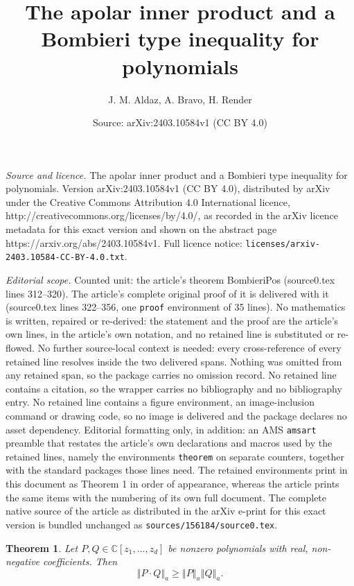 \documentclass[10pt,a4paper]{amsart}
\title{The apolar inner product and a Bombieri type inequality for polynomials}
\author{J. M. Aldaz, A. Bravo, H. Render}
\date{Source: arXiv:2403.10584v1 (CC BY 4.0)}
\newtheorem{theorem}{Theorem}
\begin{document}
\maketitle

\noindent\emph{Source and licence.} The apolar inner product and a Bombieri type inequality for polynomials. Version arXiv:2403.10584v1 (CC BY 4.0), distributed by arXiv under the Creative Commons Attribution 4.0 International licence, http://creativecommons.org/licenses/by/4.0/, as recorded in the arXiv licence metadata for this exact version and shown on the abstract page https://arxiv.org/abs/2403.10584v1. Full licence notice: \texttt{licenses/arxiv-2403.10584-CC-BY-4.0.txt}.\par\smallskip

\noindent\textit{Editorial scope.} Counted unit: the article's theorem BombieriPos (source0.tex lines 312--320). The article's complete original proof of it is delivered with it (source0.tex lines 322--356, one \texttt{proof} environment of 35 lines). No mathematics is written, repaired or re-derived: the statement and the proof are the article's own lines, in the article's own notation, and no retained line is substituted or re-flowed.  No further source-local context is needed: every cross-reference of every retained line resolves inside the two delivered spans.  Nothing was omitted from any retained span, so the package carries no omission record.  No retained line contains a citation, so the wrapper carries no bibliography and no bibliography entry.  No retained line contains a figure environment, an image-inclusion command or drawing code, so no image is delivered and the package declares no asset dependency.  Editorial formatting only, in addition: an AMS \texttt{amsart} preamble that restates the article's own declarations and macros used by the retained lines, namely the environments \texttt{theorem} on separate counters, together with the standard packages those lines need.  The retained environments print in this document as Theorem 1 in order of appearance, whereas the article prints the same items with the numbering of its own full document.  The complete native source of the article as distributed in the arXiv e-print for this exact version is bundled unchanged as \texttt{sources/156184/source0.tex}.
\begin{theorem} \label{BombieriPos}
	Let $P , Q  \in \mathbb{C}[z_{1},\dots,z_{d}]$ be nonzero 
	polynomials with real, non-negative coefficients. Then
	\[
\left\Vert P \cdot Q \right\Vert _{a}
\ge
\left\Vert P \right\Vert _{a}  \left\Vert Q \right\Vert _{a}.
\]		
\end{theorem}
\end{document}
